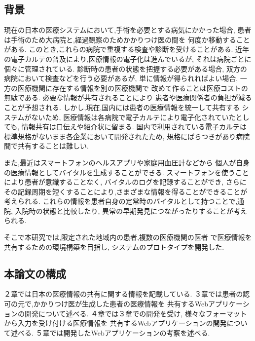 \subsection{背景}
  現在の日本の医療システムにおいて,手術を必要とする病気にかかった場合,
  患者は手術のため大病院と,経過観察のためかかりつけ医の間を
  何度か移動することがある.
  このとき,これらの病院で重複する検査や診断を受けることがある.
  近年の電子カルテの普及により,医療情報の電子化は進んでいるが,
  それは病院ごとに個々に管理されている.
  診断時の患者の状態を把握する必要がある場合,
  双方の病院において検査などを行う必要があるが,
  単に情報が得られればよい場合,
  一方の医療機関に存在する情報を別の医療機関で
  改めて作ることは医療コストの無駄である.
  必要な情報が共有されることにより
  患者や医療関係者の負担が減ることが予想される.
  しかし,現在,国内には患者の医療情報を統一して共有する
  システムがないため,
  医療情報は各病院で電子カルテにより電子化されていたとしても,
  情報共有は口伝えや紹介状に留まる.
  国内で利用されている電子カルテは標準規格がないまま各企業において開発されたため,
  規格にばらつきがあり病院間で共有することは難しい.

  また,最近はスマートフォンのヘルスアプリや家庭用血圧計などから
  個人が自身の医療情報としてバイタルを生成することができる.
  スマートフォンを使うことにより患者が意識することなく,
  バイタルのログを記録することができ,
  さらにその記録周期を短くすることにより,さまざまな情報を得ることができることが考えられる.
  これらの情報を患者自身の定常時のバイタルとして持つことで,通院,
  入院時の状態と比較したり,
  異常の早期発見につながったりすることが考えられる.

  そこで本研究では,限定された地域内の患者,複数の医療機関の医者
  で医療情報を共有するための環境構築を目指し,
  システムのプロトタイプを開発した.

\subsection{本論文の構成}
  ２章では日本の医療情報の共有に関する情報を記載している.
  ３章では患者の認可の元で,かかりつけ医が生成した患者の医療情報を
  共有するWebアプリケーションの開発について述べる.
  ４章では３章での開発を受け,
  様々なフォーマットから入力を受け付ける医療情報を
  共有するWebアプリケーションの開発について述べる.
  ５章では開発したWebアプリケーションの考察を述べる.
